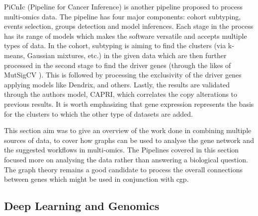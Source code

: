 
PiCnIc (Pipeline for Cancer Inference)\cite{Caravagna2016-vw} is another pipeline proposed to process multi-omics data. The pipeline has four major components: cohort subtyping, events selection, groups detection and model inferences\cite{Caravagna2016-vw}. Each stage in the process has its range of models which makes the software versatile and accepts multiple types of data. In the cohort, subtyping is aiming to find the clusters (via k-means, Gaussian mixtures, etc.) in the given data which are then further processed in the second stage to find the driver genes (through the likes of MutSigCV \cite{Lawrence2013-pl}). This is followed by processing the exclusivity of the driver genes applying models like Dendrix\cite{Vandin2012-cf}, \cite{Zhao2012-wj} and others. Lastly, the results are validated through the authors model, CAPRI, which correlates the copy alterations to previous results. It is worth emphasizing that gene expression represents the basis for the clusters to which the other type of datasets are added.


This section aim was to give an overview of the work done in combining multiple sources of data, to cover how graphs can be used to analyse the gene network and the suggested workflows in multi-omics. The Pipelines covered in this section focused more on analysing the data rather than answering a biological question. The graph theory remains a good candidate to process the overall connections between genes which might be used in conjunction with \acrlong{cgp}.

\subsection{Deep Learning  and Genomics} \label{s:dl_genomics}

\vspace{3mm}
\vspace{3mm}

